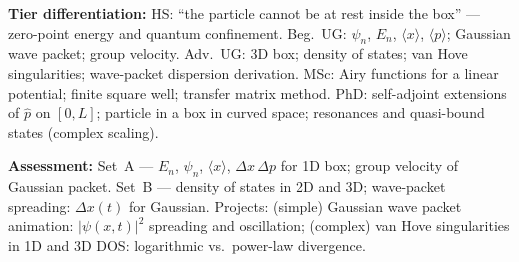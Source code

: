 \documentclass[11pt,a4paper]{article}
\begin{document}
\begin{tcolorbox}[modulebox, title={Module~I.4 / L01: Free Particle and Particle in a Box}]
\medskip\textbf{Tier differentiation:}
HS: ``the particle cannot be at rest inside the box'' --- zero-point energy and quantum confinement.
Beg.\ UG: $\psi_n$, $E_n$, $\langle x\rangle$, $\langle p\rangle$; Gaussian wave packet; group velocity.
Adv.\ UG: 3D box; density of states; van Hove singularities; wave-packet dispersion derivation.
MSc: Airy functions for a linear potential; finite square well; transfer matrix method.
PhD: self-adjoint extensions of $\hat{p}$ on $[0,L]$; particle in a box in curved space;
resonances and quasi-bound states (complex scaling).

\medskip\textbf{Assessment:}
Set~A --- $E_n$, $\psi_n$, $\langle x\rangle$, $\Delta x\,\Delta p$ for 1D box; group velocity of Gaussian packet.
Set~B --- density of states in 2D and 3D; wave-packet spreading: $\Delta x(t)$ for Gaussian.
Projects: (simple) Gaussian wave packet animation: $|\psi(x,t)|^2$ spreading and oscillation;
(complex) van Hove singularities in 1D and 3D DOS: logarithmic vs.\ power-law divergence.
\end{tcolorbox}

\medskip
\end{document}
